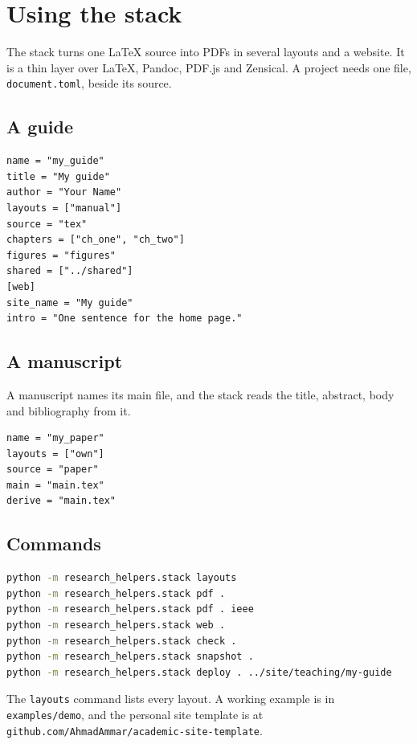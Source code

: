 \chapter{Using the stack}
\label{ch:use}

The stack turns one LaTeX source into PDFs in several layouts and a website. It is a thin layer over LaTeX, Pandoc, PDF.js and Zensical. A project needs one file, \texttt{document.toml}, beside its source.

\section{A guide}

\begin{lstlisting}[language=text]
name = "my_guide"
title = "My guide"
author = "Your Name"
layouts = ["manual"]
source = "tex"
chapters = ["ch_one", "ch_two"]
figures = "figures"
shared = ["../shared"]
[web]
site_name = "My guide"
intro = "One sentence for the home page."
\end{lstlisting}

\section{A manuscript}

A manuscript names its main file, and the stack reads the title, abstract, body and bibliography from it.

\begin{lstlisting}[language=text]
name = "my_paper"
layouts = ["own"]
source = "paper"
main = "main.tex"
derive = "main.tex"
\end{lstlisting}

\section{Commands}

\begin{lstlisting}[language=bash]
python -m research_helpers.stack layouts
python -m research_helpers.stack pdf .
python -m research_helpers.stack pdf . ieee
python -m research_helpers.stack web .
python -m research_helpers.stack check .
python -m research_helpers.stack snapshot .
python -m research_helpers.stack deploy . ../site/teaching/my-guide
\end{lstlisting}

The \texttt{layouts} command lists every layout. A working example is in \texttt{examples/demo}, and the personal site template is at \texttt{github.com/AhmadAmmar/academic-site-template}.
